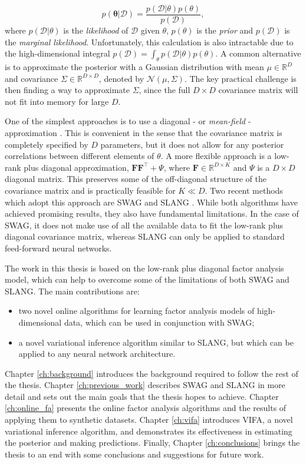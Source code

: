 \documentclass[msc,deptreport.inf]{infthesis} %
\newcommand{\matr}[1]{\mathbf{#1}}
\newcommand{\bgreek}[1]{\boldsymbol{#1}}
\newcommand{\R}{\mathbb R}
\begin{document}
\begin{equation}
	p(\bgreek{\theta} | \mathcal{D}) = \frac{p(\mathcal{D} | \theta) p(\theta)}{p(\mathcal{D})},
\end{equation}
where $p(\mathcal{D} | \theta)$ is the \emph{likelihood} of $\mathcal{D}$ given $\theta$, $p(\theta)$ is the \emph{prior} and $p(\mathcal{D})$ is the \emph{marginal likelihood}. Unfortunately, this calculation is also intractable due to the high-dimensional integral $p(\mathcal{D}) = \int_\theta p(\mathcal{D} | \theta) p(\theta)$. A common alternative is to approximate the posterior with a Gaussian distribution with mean $\mu \in \R^D$ and covariance $\Sigma \in \R^{D\times D}$, denoted by $\mathcal{N}(\mu, \Sigma)$. The key practical challenge is then finding a way to approximate $\Sigma$, since the full $D\times D$ covariance matrix will not fit into memory for large $D$. 

One of the simplest approaches is to use a diagonal - or \emph{mean-field} - approximation \cite{blundell2015, graves2011, hernandez2015, tangkaratt2018, ranganath2014}. This is convenient in the sense that the covariance matrix is completely specified by $D$ parameters, but it does not allow for any posterior correlations between different elements of $\theta$. A more flexible approach is a low-rank plus diagonal approximation, $\matr{F}\matr{F}^\intercal + \Psi$, where $\matr{F} \in \R^{D\times K}$ and $\Psi$ is a $D \times D$ diagonal matrix. This preserves some of the off-diagonal structure of the covariance matrix and is practically feasible for $K \ll D$. Two recent methods which adopt this approach are SWAG \cite{maddox2019} and SLANG \cite{mishkin2018}. While both algorithms have achieved promising results, they also have fundamental limitations. In the case of SWAG, it does not make use of all the available data to fit the low-rank plus diagonal covariance matrix, whereas SLANG can only be applied to standard feed-forward neural networks. 

The work in this thesis is based on the low-rank plus diagonal factor analysis model, which can help to overcome some of the limitations of both SWAG and SLANG. The main contributions are:
\begin{itemize}
	\item two novel online algorithms for learning factor analysis models of high-dimensional data, which can be used in conjunction with 	SWAG;
	\item a novel variational inference algorithm similar to SLANG, but which can be applied to any neural network architecture. 
\end{itemize} 
Chapter \ref{ch:background} introduces the background required to follow the rest of the thesis. Chapter \ref{ch:previous_work} describes SWAG and SLANG in more detail and sets out the main goals that the thesis hopes to achieve. Chapter \ref{ch:online_fa} presents the online factor analysis algorithms and the results of applying them to synthetic datasets. Chapter \ref{ch:vifa} introduces VIFA, a novel variational inference algorithm, and demonstrates its effectiveness in estimating the posterior and making predictions. Finally, Chapter \ref{ch:conclusions} brings the thesis to an end with some conclusions and suggestions for future work. 
\end{document}
